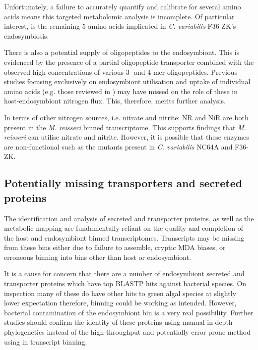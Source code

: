 Unfortunately, a failure to accurately quantify and calibrate
for several amino acids means this targeted metabolomic analysis
is incomplete.  Of particular interest, is the remaining 5 amino acids
implicated in \textit{C. variabilis} F36-ZK's endosymbiosis.


There is also a potential supply of oligopeptides to the endosymbiont.
This is evidenced by the presence of a partial oligopeptide transporter 
combined with the observed high concentrations of various 3- and 4-mer oligopeptides.
Previous studies focusing exclusively on endosymbiont utilisation
and uptake of individual amino acids (e.g. those reviewed in \citep{Kato2009a}) 
may have missed on the role of these in host-endosymbiont nitrogen flux.
This, therefore, merits further analysis.



%
%

In terms of other nitrogen sources, i.e. nitrate and nitrite:
NR and NiR are both present in the \textit{M. reisseri} binned transcriptome.
This supports findings that \textit{M. reisseri} can utilise nitrate and nitrite.
However, it is possible that these enzymes are non-functional such as the mutants
present in \textit{C. variabilis} NC64A and F36-ZK.


\subsection{Potentially missing transporters and secreted proteins}

The identification and analysis of secreted and transporter proteins,
as well as the metabolic mapping are fundamentally reliant on the quality and completion
of the host and endosymbiont binned transcriptomes. 
Transcripts may be missing from these bins either due to failure to assemble, 
cryptic MDA biases, or erroneous binning into bins other than host or endosymbiont.

It is a cause for concern that there are a number of endosymbiont secreted and transporter proteins 
which have top BLASTP hits against bacterial species.  
On inspection many of these do have
other hits to green algal species at slightly lower expectation
therefore, binning could be working as intended. However,
bacterial contamination of the endosymbiont bin is 
a very real possibility. 
Further studies should confirm the identity of these proteins using
manual in-depth phylogenetics instead of the high-throughput and potentially
error prone method using in transcript binning.


